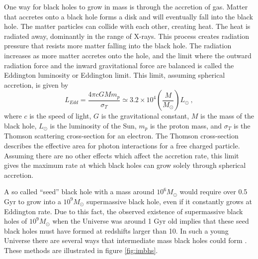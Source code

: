 \documentclass[english, oneside]{HYgradu}
\begin{document}
One way for black holes to grow in mass is through the accretion of gas. Matter that accretes onto a black hole forms a disk and will eventually fall into the black hole. The matter particles can collide with each other, creating heat. The heat is radiated away, dominantly in the range of X-rays. This process creates radiation pressure that resists more matter falling into the black hole. The radiation increases as more matter accretes onto the hole, and the limit where the outward radiation force and the inward gravitational force are balanced is called the Eddington luminosity or Eddington limit. This limit, assuming spherical accretion, is given by
\begin{equation}
L_{Edd} = \frac{4 \pi c G M m_p}{\sigma_T} \simeq 3.2 \times 10^4 \left( \frac{M}{M_\odot} \right) L_\odot \ ,
\end{equation}
where $c$ is the speed of light, $G$ is the gravitational constant, $M$ is the mass of the black hole, $L_\odot$ is the luminosity of the Sun, $m_p$ is the proton mass, and $\sigma_T$ is the Thomson scattering cross-section for an electron. The Thomson cross-section describes the effective area for photon interactions for a free charged particle. Assuming there are no other effects which affect the accretion rate, this limit gives the maximum rate at which black holes can grow solely through spherical accretion. 

A so called ``seed'' black hole with a mass around $10^6 M_\odot$ would require over 0.5 Gyr to grow into a $10^9 M_\odot$ supermassive black hole, even if it constantly grows at Eddington rate. Due to this fact, the observed existence of supermassive black holes of $10^9 M_\odot$ when the Universe was around 1 Gyr old implies that these seed black holes must have formed at redshifts larger than 10. In such a young Universe there are several ways that intermediate mass black holes could form \citep{mezcua:2017}. These methods are illustrated in figure \ref{fig:imbhs}.
\end{document}
